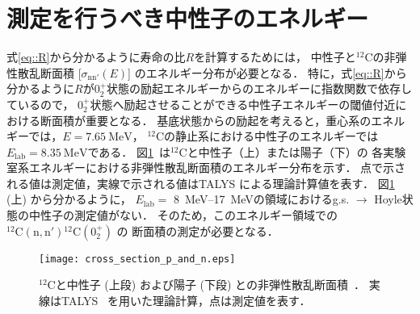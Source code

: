 \documentclass[../master]{subfiles}
\begin{document}
\section{測定を行うべき中性子のエネルギー}
式\eqref{eq::R}から分かるように寿命の比$R$を計算するためには，
中性子と${}^{12}\mathrm{C}$の非弾性散乱断面積 [$\sigma_\mathrm{nn'} (E)$] のエネルギー分布が必要となる．
特に，式\eqref{eq::R}から分かるように$R$が$0_2^+$状態の励起エネルギーからのエネルギーに指数関数で依存しているので，
$0_2^+$状態へ励起させることができる中性子エネルギーの閾値付近における断面積が重要となる．
基底状態からの励起を考えると，重心系のエネルギーでは，$E=\SI{7.65}{\mega\electronvolt}$，
${}^{12}\mathrm{C}$の静止系における中性子のエネルギーでは$E_{\text{lab}} = \SI{8.35}{\mega\electronvolt}$である．
図\ref{fig::crosssection_pres}~\cite{hotdensemedium}は${}^{12}\mathrm{C}$と中性子（上）または陽子（下）の
各実験室系エネルギーにおける非弾性散乱断面積のエネルギー分布を示す．
点で示される値は測定値，実線で示される値はTALYS による理論計算値を表す．
図\ref{fig::crosssection_pres} (上) から分かるように，
$E_{\text{lab}} =$ \SIrange{8}{17}{\mega\electronvolt}の領域におけるg.s. $\rightarrow$ Hoyle状態の中性子の測定値がない．
そのため，このエネルギー領域での ${}^{12}\mathrm{C}(\mathrm{n},\mathrm{n}'){}^{12}\mathrm{C} (0_2^+)$ の
断面積の測定が必要となる．
\begin{figure}
  \centering
  \texttt{[image: cross\_section\_p\_and\_n.eps]}
  \caption[${}^{12}\mathrm{C}$と中性子 (上段) および陽子 (下段) との非弾性散乱断面積．]
          {${}^{12}\mathrm{C}$と中性子 (上段) および陽子 (下段) との非弾性散乱断面積~\cite{hotdensemedium}．
  実線はTALYS~\cite{talys-1.0} を用いた理論計算，点は測定値を表す．}
  \label{fig::crosssection_pres}
\end{figure}
\end{document}
